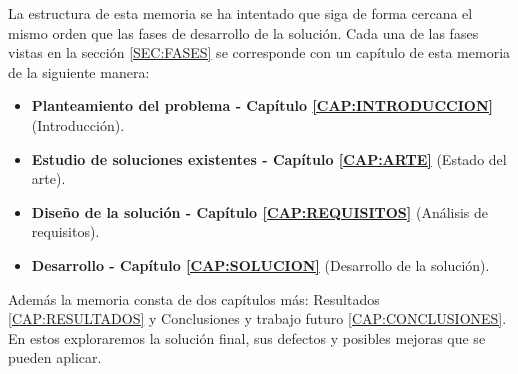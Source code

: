La estructura de esta memoria se ha intentado que siga de forma cercana el mismo orden que las fases de desarrollo de la solución. Cada una de las fases vistas en la sección \ref{SEC:FASES} se corresponde con un capítulo de esta memoria de la siguiente manera:

\begin{itemize}
    \item \textbf{Planteamiento del problema - Capítulo \ref{CAP:INTRODUCCION}} (Introducción).
    \item \textbf{Estudio de soluciones existentes - Capítulo \ref{CAP:ARTE}} (Estado del arte).
    \item \textbf{Diseño de la solución - Capítulo \ref{CAP:REQUISITOS}} (Análisis de requisitos).
    \item \textbf{Desarrollo - Capítulo \ref{CAP:SOLUCION}} (Desarrollo de la solución).
\end{itemize}

Además la memoria consta de dos capítulos más: Resultados \ref{CAP:RESULTADOS} y Conclusiones y trabajo futuro \ref{CAP:CONCLUSIONES}. En estos exploraremos la solución final, sus defectos y posibles mejoras que se pueden aplicar.
